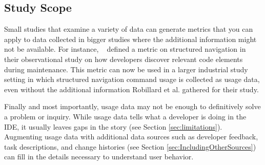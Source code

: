 \subsection{Study Scope}

Small studies that examine a variety of data can generate metrics that you can apply to data collected in bigger studies where the additional information might not be available. 
        For instance, ~\citet{wbsnipes:Robillard2004How} defined a metric on structured navigation in their observational study on how developers discover relevant code elements during maintenance. This metric can now be used in a larger industrial study setting in which structured navigation command usage is collected as usage data, even without the additional information Robillard et al. gathered for their study.

Finally and most importantly, usage data may not be enough to definitively solve a problem or inquiry. While usage data tells what a developer is doing in the IDE, it usually leaves gaps in the story (see Section \ref{sec:limitations}).  Augmenting usage data with additional data sources such as developer feedback, task descriptions, and change histories (see Section \ref{sec:IncludingOtherSources}) can fill in the details necessary to understand user behavior.



